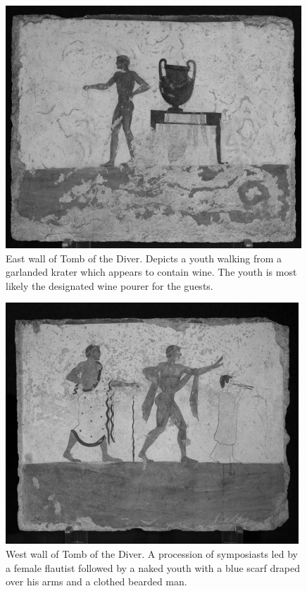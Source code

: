 \begin{figure}[H]
    \centering
    \includegraphics[scale = 0.3]{../images/East.PNG}
    \caption{East wall of Tomb of the Diver. Depicts a youth walking from a garlanded krater which appears to contain wine. The youth is most likely the designated wine pourer for the guests.}
    \label{fig:east}
\end{figure}


\begin{figure}[H]
    \centering
    \includegraphics[scale = 0.3]{../images/West.PNG}
    \caption{West wall of Tomb of the Diver. A procession of symposiasts led by a female flautist followed by a naked youth with a blue scarf draped over his arms and a clothed bearded man.}
    \label{fig:west}
\end{figure}




